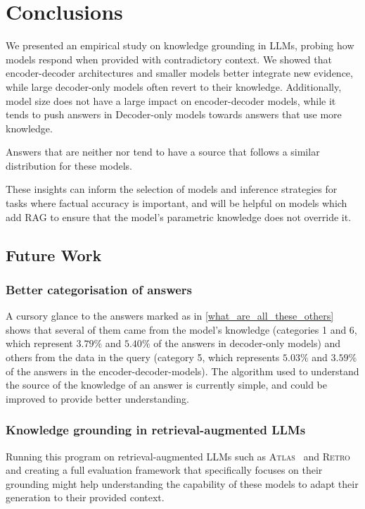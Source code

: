 \section{Conclusions}

We presented an empirical study on knowledge grounding in LLMs, probing how models respond when provided with contradictory context.
We showed that encoder-decoder architectures and smaller models better integrate new evidence, while large decoder-only models often revert to their \Parametric{} knowledge.  Additionally, model size does not have a large impact on encoder-decoder models, while it tends to push answers in Decoder-only models towards answers that use more \Parametric{} knowledge.

Answers that are neither \Parametric{} nor \Contextual{} tend to have a source that follows a similar distribution for these models.

These insights can inform the selection of models and inference strategies for tasks where factual accuracy is important, and will be helpful on models which add RAG to ensure that the model's parametric knowledge does not override it.

\subsection{Future Work}

\subsubsection{Better categorisation of \Other{} answers}
A cursory glance to the answers marked as \Other{} in \cref{what_are_all_these_others} shows that several of them came from the model's \Parametric{} knowledge (categories 1 and 6, which represent $3.79\%$ and $5.40\%$ of the answers in decoder-only models) and others from the \Contextual{} data in the query (category 5, which represents $5.03\%$ and $3.59\%$ of the answers in the encoder-decoder-models).
The algorithm used to understand the source of the knowledge of an answer is currently simple, and could be improved to provide better understanding.

\subsubsection{Knowledge grounding in retrieval-augmented LLMs}
Running this program on retrieval-augmented LLMs such as \textsc{Atlas}~\cite{atlas_foundational} and \textsc{Retro}~\cite{retro} and creating a full evaluation framework that specifically focuses on their grounding might help understanding the capability of these models to adapt their generation to their provided context.

